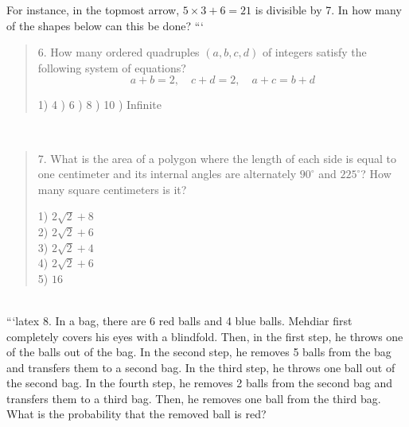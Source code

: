 For instance, in the topmost arrow, $5 \times 3 + 6 = 21$ is divisible by 7. In how many of the shapes below can this be done?
```
\\
\begin{quote}
6. How many ordered quadruples $(a, b, c, d)$ of integers satisfy the following system of equations?  
\[
a + b = 2, \quad c + d = 2, \quad a + c = b + d
\]

1) 4 ) 6 ) 8 ) 10 ) Infinite
\end{quote}
\\
\begin{quote}
7. What is the area of a polygon where the length of each side is equal to one centimeter and its internal angles are alternately $90^\circ$ and $225^\circ$? How many square centimeters is it?

1) $2\sqrt{2} + 8$ \\
2) $2\sqrt{2} + 6$ \\
3) $2\sqrt{2} + 4$ \\
4) $2\sqrt{2} + 6$ \\
5) $16$
\end{quote}
\\
```latex
8. In a bag, there are 6 red balls and 4 blue balls. 
Mehdiar first completely covers his eyes with a blindfold. 
Then, in the first step, he throws one of the balls out of the bag. 
In the second step, he removes 5 balls from the bag and transfers them to a second bag. 
In the third step, he throws one ball out of the second bag. 
In the fourth step, he removes 2 balls from the second bag and transfers them to a third bag. 
Then, he removes one ball from the third bag. What is the probability that the removed ball is red?


